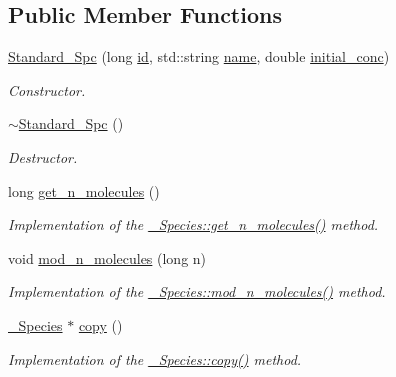 \subsection*{Public Member Functions}
\begin{DoxyCompactItemize}
\item 
\hyperlink{classnw_1_1_standard___spc_aba0f0fbe55666cbcf5fbdd8d66f51565}{Standard\+\_\+\+Spc} (long \hyperlink{classnw_1_1___species_ac42dfe1c656c17178a9649093519ebb7}{id}, std\+::string \hyperlink{classnw_1_1___species_a7b8ede09e28941beb48cf27f1247e2f9}{name}, double \hyperlink{classnw_1_1___species_ac66cdd3bdd5be88791e00d063b4e92a2}{initial\+\_\+conc})
\begin{DoxyCompactList}\small\item\em Constructor. \end{DoxyCompactList}\item 
\hyperlink{classnw_1_1_standard___spc_a8113363092a1784829d8f22149d2cef0}{$\sim$\+Standard\+\_\+\+Spc} ()
\begin{DoxyCompactList}\small\item\em Destructor. \end{DoxyCompactList}\item 
long \hyperlink{classnw_1_1_standard___spc_aa1b07cee6c86dd83aa9970c0964d16fc}{get\+\_\+n\+\_\+molecules} ()
\begin{DoxyCompactList}\small\item\em Implementation of the \hyperlink{classnw_1_1___species_a6e3e68477663ff511d75fb24cf01cb9f}{\+\_\+\+Species\+::get\+\_\+n\+\_\+molecules()} method. \end{DoxyCompactList}\item 
void \hyperlink{classnw_1_1_standard___spc_aed4c0ba53c924011269b59a4a5181fe4}{mod\+\_\+n\+\_\+molecules} (long n)
\begin{DoxyCompactList}\small\item\em Implementation of the \hyperlink{classnw_1_1___species_ac7955c9fe040d8cae8f3cae4684ed96b}{\+\_\+\+Species\+::mod\+\_\+n\+\_\+molecules()} method. \end{DoxyCompactList}\item 
\hyperlink{classnw_1_1___species}{\+\_\+\+Species} $\ast$ \hyperlink{classnw_1_1_standard___spc_abc6e6a61ebdcd1e1b917c3e3a5f9cd24}{copy} ()
\begin{DoxyCompactList}\small\item\em Implementation of the \hyperlink{classnw_1_1___species_aea43d96b0b1c9e88953f40fbe58e7f29}{\+\_\+\+Species\+::copy()} method. \end{DoxyCompactList}\end{DoxyCompactItemize}
